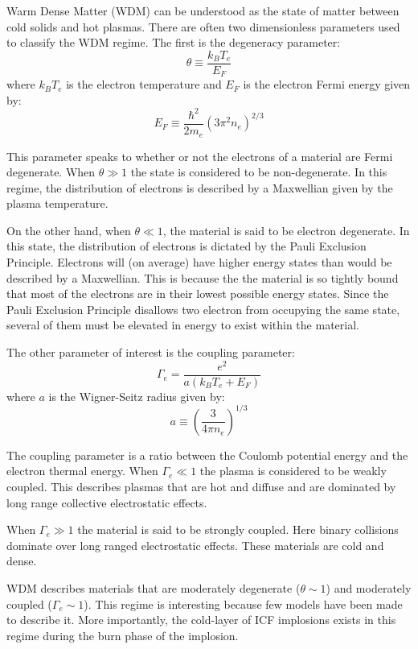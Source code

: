 Warm Dense Matter (WDM) can be understood as the state of matter between cold solids and hot plasmas. There are often two dimensionless parameters used to classify the WDM regime. The first is the degeneracy parameter:
%
\begin{equation}
    \theta \equiv \frac{k_BT_e}{E_F}
\end{equation}
%
where $k_BT_e$ is the electron temperature and $E_F$ is the electron Fermi energy given by:
%
\begin{equation}
    E_F \equiv \frac{\hbar^2}{2m_e}\left(3\pi^2 n_e\right)^{2/3} 
\end{equation}

This parameter speaks to whether or not the electrons of a material are Fermi degenerate. When $\theta \gg 1$ the state is considered to be non-degenerate. In this regime, the distribution of electrons is described by a Maxwellian given by the plasma temperature. 

On the other hand, when $\theta \ll 1$, the material is said to be electron degenerate. In this state, the distribution of electrons is dictated by the Pauli Exclusion Principle. Electrons will (on average) have higher energy states than would be described by a Maxwellian. This is because the the material is so tightly bound that most of the electrons are in their lowest possible energy states. Since the Pauli Exclusion Principle disallows two electron from occupying the same state, several of them must be elevated in energy to exist within the material. 

The other parameter of interest is the coupling parameter:
%
\begin{equation}
    \Gamma_e = \frac{e^2}{a\left(k_BT_e + E_F\right)}
\end{equation}
%
where $a$ is the Wigner-Seitz radius given by:
%
\begin{equation*}
    a \equiv \left(\frac{3}{4\pi n_e}\right)^{1/3}
\end{equation*}

The coupling parameter is a ratio between the Coulomb potential energy and the electron thermal energy. When $\Gamma_e \ll 1$ the plasma is considered to be weakly coupled. This describes plasmas that are hot and diffuse and are dominated by long range collective electrostatic effects.

When $\Gamma_e \gg 1$ the material is said to be strongly coupled. Here binary collisions dominate over long ranged electrostatic effects. These materials are cold and dense.

WDM describes materials that are moderately degenerate ($\theta \sim 1$) and moderately coupled ($\Gamma_e\sim1$). This regime is interesting because few models have been made to describe it. More importantly, the cold-layer of ICF implosions exists in this regime during the burn phase of the implosion. 